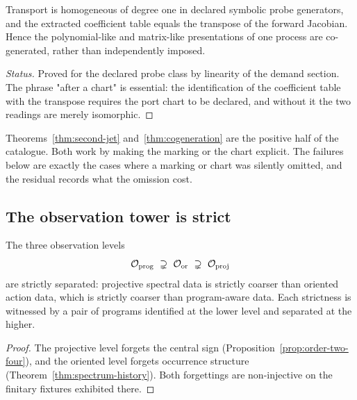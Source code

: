 \begin{theorem}\label{thm:cogeneration}
Transport is homogeneous of degree one in declared symbolic probe generators, and the
extracted coefficient table equals the transpose of the forward Jacobian.  Hence the
polynomial-like and matrix-like presentations of one process are co-generated, rather
than independently imposed.
\end{theorem}

\begin{proof}[Status]
Proved for the declared probe class by linearity of the demand section.  The phrase
"after a chart" is essential: the identification of the coefficient table with the
transpose requires the port chart to be declared, and without it the two readings are
merely isomorphic.
\end{proof}

\begin{remark}
Theorems~\ref{thm:second-jet} and~\ref{thm:cogeneration} are the positive half of the
catalogue.  Both work by making the marking or the chart explicit.  The failures below
are exactly the cases where a marking or chart was silently omitted, and the residual
records what the omission cost.
\end{remark}

\subsection{The observation tower is strict}

\begin{theorem}\label{thm:observation-tower}
The three observation levels
\[
  \cO_{\mathrm{prog}}\ \supsetneq\ \cO_{\mathrm{or}}\ \supsetneq\ \cO_{\mathrm{proj}}
\]
are strictly separated: projective spectral data is strictly coarser than oriented action
data, which is strictly coarser than program-aware data.  Each strictness is witnessed by
a pair of programs identified at the lower level and separated at the higher.
\end{theorem}

\begin{proof}
The projective level forgets the central sign
(Proposition~\ref{prop:order-two-four}), and the oriented level forgets occurrence
structure (Theorem~\ref{thm:spectrum-history}).  Both forgettings are non-injective on the
finitary fixtures exhibited there.
\end{proof}

